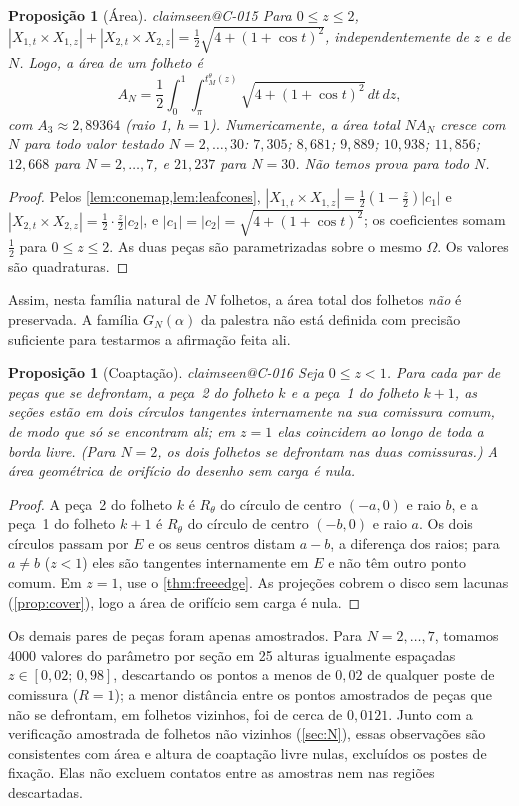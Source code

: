 \documentclass[11pt,a4paper]{article}
\makeatletter
\theoremstyle{plain}
\newtheorem{proposition}[theorem]{Proposição}
\theoremstyle{remark}
\newcommand{\claim}[1]{\ifcsname claimseen@#1\endcsname\else\expandafter\gdef\csname claimseen@#1\endcsname{}\label{claim:#1}\fi}
\makeatother
\begin{document}
\begin{proposition}[Área]\label{prop:area}\claim{C-015}
Para $0\le z\le2$, $|X_{1,t}\times X_{1,z}|+|X_{2,t}\times X_{2,z}|=\tfrac12\sqrt{4+(1+\cos t)^2}$, independentemente de $z$ e
de $N$. Logo, a área de um folheto é
\[ A_N=\frac12\int_0^1\!\!\int_\pi^{t^\theta_M(z)}\sqrt{4+(1+\cos t)^2}\,dt\,dz, \]
com $A_3\approx2{,}89364$ (raio 1, $h=1$). Numericamente, a área total $N A_N$ cresce com $N$ para todo valor testado
$N=2,\dots,30$: $7{,}305$; $8{,}681$; $9{,}889$; $10{,}938$; $11{,}856$; $12{,}668$ para $N=2,\dots,7$, e $21{,}237$ para
$N=30$. Não temos prova para todo $N$.
\end{proposition}
\begin{proof}
Pelos \cref{lem:conemap,lem:leafcones}, $|X_{1,t}\times X_{1,z}|=\frac12(1-\frac z2)|c_1|$ e
$|X_{2,t}\times X_{2,z}|=\frac12\cdot\frac z2|c_2|$, e $|c_1|=|c_2|=\sqrt{4+(1+\cos t)^2}$; os coeficientes somam $\frac12$
para $0\le z\le2$. As duas peças são parametrizadas sobre o mesmo $\Omega$. Os valores são quadraturas.
\end{proof}

Assim, nesta família natural de $N$ folhetos, a área total dos folhetos \emph{não} é preservada. A família $G_N(\alpha)$ da
palestra não está definida com precisão suficiente para testarmos a afirmação feita ali.

\begin{proposition}[Coaptação]\label{prop:coapt}\claim{C-016}
Seja $0\le z<1$. Para cada par de peças que se defrontam, a peça~2 do folheto $k$ e a peça~1 do folheto $k+1$, as seções estão
em dois círculos tangentes internamente na sua comissura comum, de modo que só se encontram ali; em $z=1$ elas coincidem ao
longo de toda a borda livre. (Para $N=2$, os dois folhetos se defrontam nas duas comissuras.) A área geométrica de orifício do
desenho sem carga é nula.
\end{proposition}
\begin{proof}
A peça~2 do folheto $k$ é $R_\theta$ do círculo de centro $(-a,0)$ e raio $b$, e a peça~1 do folheto $k+1$ é $R_\theta$ do
círculo de centro $(-b,0)$ e raio $a$. Os dois círculos passam por $E$ e os seus centros distam $a-b$, a diferença dos raios;
para $a\ne b$ ($z<1$) eles são tangentes internamente em $E$ e não têm outro ponto comum. Em $z=1$, use o
\cref{thm:freeedge}. As projeções cobrem o disco sem lacunas (\cref{prop:cover}), logo a área de orifício sem carga é nula.
\end{proof}
Os demais pares de peças foram apenas amostrados. Para $N=2,\dots,7$, tomamos 4000 valores do parâmetro por seção em 25
alturas igualmente espaçadas $z\in[0{,}02;\,0{,}98]$, descartando os pontos a menos de $0{,}02$ de qualquer poste de comissura
($R=1$); a menor distância entre os pontos amostrados de peças que não se defrontam, em folhetos vizinhos, foi de cerca de
$0{,}0121$. Junto com a verificação amostrada de folhetos não vizinhos (\cref{sec:N}), essas observações são consistentes com
área e altura de coaptação livre nulas, excluídos os postes de fixação. Elas não excluem contatos entre as amostras nem nas
regiões descartadas.
\end{document}
